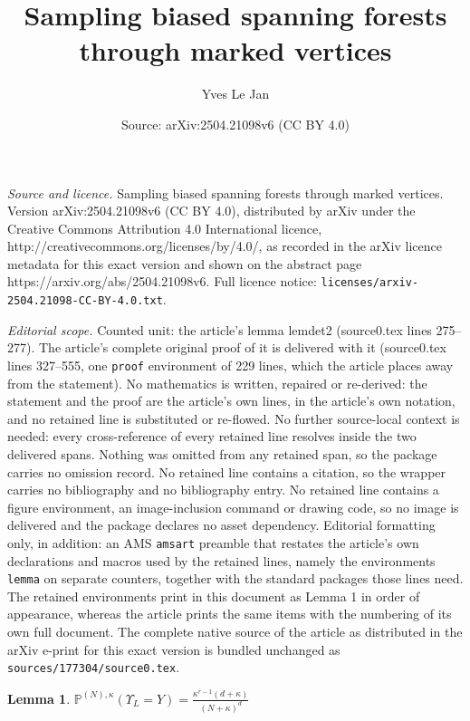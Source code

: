 \documentclass[10pt,a4paper]{amsart}
\title{Sampling biased spanning forests through marked vertices}
\author{Yves Le Jan}
\date{Source: arXiv:2504.21098v6 (CC BY 4.0)}
\newtheorem{lemma}{Lemma}
\begin{document}
\maketitle

\noindent\emph{Source and licence.} Sampling biased spanning forests through marked vertices. Version arXiv:2504.21098v6 (CC BY 4.0), distributed by arXiv under the Creative Commons Attribution 4.0 International licence, http://creativecommons.org/licenses/by/4.0/, as recorded in the arXiv licence metadata for this exact version and shown on the abstract page https://arxiv.org/abs/2504.21098v6. Full licence notice: \texttt{licenses/arxiv-2504.21098-CC-BY-4.0.txt}.\par\smallskip

\noindent\textit{Editorial scope.} Counted unit: the article's lemma lemdet2 (source0.tex lines 275--277). The article's complete original proof of it is delivered with it (source0.tex lines 327--555, one \texttt{proof} environment of 229 lines, which the article places away from the statement). No mathematics is written, repaired or re-derived: the statement and the proof are the article's own lines, in the article's own notation, and no retained line is substituted or re-flowed.  No further source-local context is needed: every cross-reference of every retained line resolves inside the two delivered spans.  Nothing was omitted from any retained span, so the package carries no omission record.  No retained line contains a citation, so the wrapper carries no bibliography and no bibliography entry.  No retained line contains a figure environment, an image-inclusion command or drawing code, so no image is delivered and the package declares no asset dependency.  Editorial formatting only, in addition: an AMS \texttt{amsart} preamble that restates the article's own declarations and macros used by the retained lines, namely the environments \texttt{lemma} on separate counters, together with the standard packages those lines need.  The retained environments print in this document as Lemma 1 in order of appearance, whereas the article prints the same items with the numbering of its own full document.  The complete native source of the article as distributed in the arXiv e-print for this exact version is bundled unchanged as \texttt{sources/177304/source0.tex}.
 \begin{lemma}\label{lemdet2}
$\mathbb{P}^{(N),\kappa}(\Upsilon_L=Y)=\frac {\kappa^{r-1}(d+\kappa)}{(N+\kappa)^d} $
\end{lemma}
\end{document}
